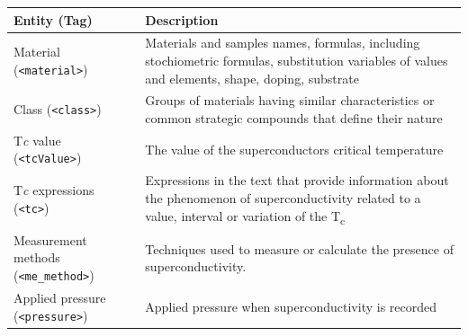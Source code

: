 \documentclass[]{interact}
\theoremstyle{plain}%
\theoremstyle{definition}
\theoremstyle{remark}
\begin{document}
\begin{table}[ht]
    {\begin{tabular}{m{19em} m{30em}}
        \toprule
        \textbf{Entity} (\textbf{Tag})              & \textbf{Description} \\
        \midrule
        Material (\texttt{<material>})              & Materials and samples names, formulas, including stochiometric formulas, substitution variables of values and elements, shape, doping, substrate               \\
        Class (\texttt{<class>})                    & Groups of materials having similar characteristics or common strategic compounds that define their nature                                                      \\
        T\textit{c} value (\texttt{<tcValue>})      & The value of the superconductors critical temperature                                                                                                          \\
        T\textit{c} expressions (\texttt{<tc>})     & Expressions in the text that provide information about the phenomenon of superconductivity related to a value, interval or variation of the T\textsubscript{c} \\
        Measurement methods (\texttt{<me\_method>}) & Techniques used to measure or calculate the presence of superconductivity.                                                                                     \\
        Applied pressure (\texttt{<pressure>})      & Applied pressure when superconductivity is recorded                                                                                                            \\
        \bottomrule
    \end{tabular}}
    \label{tab:superconductors-parser-entities}
\end{table}
\end{document}
